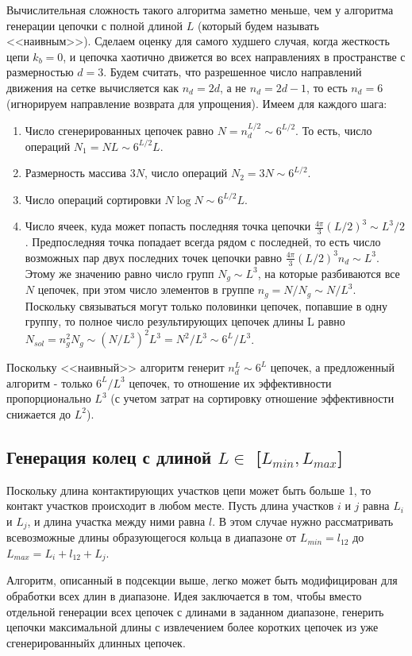 \documentclass[tikz,a4paper]{scrartcl} %
\begin{document}
Вычислительная сложность такого алгоритма заметно меньше, чем у алгоритма генерации цепочки с полной длиной $L$ (который будем называть <<наивным>>). Сделаем оценку для самого худшего случая, когда жесткость цепи $k_b=0$, и цепочка хаотично движется во всех направлениях в пространстве с размерностью $d=3$. Будем считать, что разрешенное число направлений движения на сетке вычисляется как $n_d = 2d$, а не $n_d = 2d-1$, то есть $n_d =6$ (игнорируем направление возврата для упрощения). Имеем для каждого шага: 
\begin{enumerate}
\item Число сгенерированных цепочек равно $N = n_d^{L/2} \sim 6^{L/2}$. То есть, число операций $N_1 = N L \sim 6^{L/2} L$.
\item Размерность массива $3 N$, число операций $N_2 = 3 N \sim 6^{L/2}$.
\item Число операций сортировки $N \log N \sim 6^{L/2} L$.
\item Число ячеек, куда может попасть последняя точка цепочки $\frac{4\pi}{3}(L/2)^3 \sim L^3/2$. Предпоследняя точка попадает всегда рядом с последней, то есть число возможных пар двух последних точек цепочки равно $\frac{4\pi}{3}(L/2)^3 n_d \sim L^3$. Этому же значению равно число групп $N_g \sim L^3$, на которые разбиваются все $N$ цепочек, при этом число элементов в группе $n_g = N/N_g \sim N/ L^3$. Поскольку связываться могут только половинки цепочек, попавшие в одну группу, то полное число результирующих цепочек длины L равно $N_{sol} = n_g^2 N_g \sim (N/L^3)^2 L^3 = N^2 / L^3 \sim 6^L / L^3$.
\end{enumerate}
Поскольку <<наивный>> алгоритм генерит $n_d^L \sim 6^L$ цепочек, а предложенный алгоритм - только $6^L / L^3$ цепочек, то отношение их эффективности пропорционально $L^3$ (с учетом затрат на сортировку отношение эффективности снижается до $L^2$).

\subsection*{Генерация колец с длиной $L \in$ [$L_{min}, L_{max}$]}
Поскольку длина контактирующих участков цепи может быть больше 1, то контакт участков происходит в любом месте. Пусть длина участков $i$ и $j$ равна $L_i$ и $L_j$, и длина участка между ними равна $l$. В этом случае нужно рассматривать всевозможные длины образующегося кольца в диапазоне от $L_{min} = l_{12}$ до $L_{max} = L_i + l_{12} + L_j$. 

Алгоритм, описанный в подсекции выше, легко может быть модифицирован для обработки всех длин в диапазоне. Идея заключается в том, чтобы вместо отдельной генерации всех цепочек с длинами в заданном диапазоне, генерить цепочки максимальной длины с извлечением более коротких цепочек из уже сгенерированныйх длинных цепочек.
\end{document}
